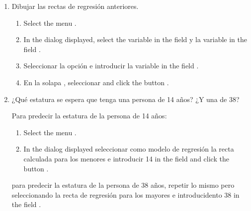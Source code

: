 \begin{enumerate}[leftmargin=*]
\begin{enumerate}
\item Dibujar las rectas de regresión anteriores.
\begin{indication}
\begin{enumerate}
\item Select the menu .
\item In the dialog displayed, select the variable  in the field  y
la variable  in the field .
\item Seleccionar la opción  e introducir la variable  in the field
.
\item En la solapa , seleccionar  and click the button
.
\end{enumerate}
\end{indication}

\item ¿Qué estatura se espera que tenga una persona de 14 años? ¿Y una de 38?
\begin{indication}
Para predecir la estatura de la persona de 14 años:
\begin{enumerate}
\item Select the menu .
\item In the dialog displayed seleccionar como modelo de regresión la recta calculada para los menores e
introducir 14 in the field  and click the button
.
\end{enumerate}
para predecir la estatura de la persona de 38 años, repetir lo mismo pero seleccionando la recta de regresión para los
mayores e introducidento 38 in the field .
\end{indication}
\end{enumerate}

\end{enumerate}
